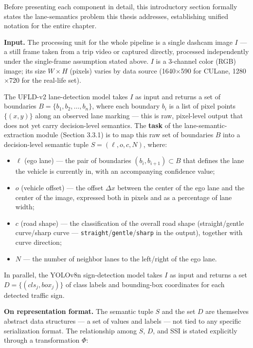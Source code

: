 \documentclass[12pt,a4paper]{report}
\begin{document}
Before presenting each component in detail, this introductory section formally states the lane-semantics problem this thesis addresses, establishing unified notation for the entire chapter.

\textbf{Input.} The processing unit for the whole pipeline is a single dashcam image $I$ --- a still frame taken from a trip video or captured directly, processed independently under the single-frame assumption stated above. $I$ is a 3-channel color (RGB) image; its size $W \times H$ (pixels) varies by data source (1640$\times$590 for CULane, 1280$\times$720 for the real-life set).

The UFLD-v2 lane-detection model takes $I$ as input and returns a set of boundaries $B = \{b_1, b_2, \ldots, b_n\}$, where each boundary $b_i$ is a list of pixel points $\{(x, y)\}$ along an observed lane marking --- this is raw, pixel-level output that does not yet carry decision-level semantics. The \textbf{task} of the lane-semantic-extraction module (Section 3.3.1) is to map this raw set of boundaries $B$ into a decision-level semantic tuple $S = (\ell, o, c, N)$, where:

\begin{itemize}
    \item $\ell$ (ego lane) --- the pair of boundaries $(b_i, b_{i+1}) \subset B$ that defines the lane the vehicle is currently in, with an accompanying confidence value;
    \item $o$ (vehicle offset) --- the offset $\Delta x$ between the center of the ego lane and the center of the image, expressed both in pixels and as a percentage of lane width;
    \item $c$ (road shape) --- the classification of the overall road shape (straight/gentle curve/sharp curve --- \texttt{straight}/\texttt{gentle}/\texttt{sharp} in the output), together with curve direction;
    \item $N$ --- the number of neighbor lanes to the left/right of the ego lane.
\end{itemize}

In parallel, the YOLOv8n sign-detection model takes $I$ as input and returns a set $D = \{(cls_j, box_j)\}$ of class labels and bounding-box coordinates for each detected traffic sign.

\textbf{On representation format.} The semantic tuple $S$ and the set $D$ are themselves abstract data structures --- a set of values and labels --- not tied to any specific serialization format. The relationship among $S$, $D$, and SSI is stated explicitly through a transformation $\Phi$:
\end{document}
